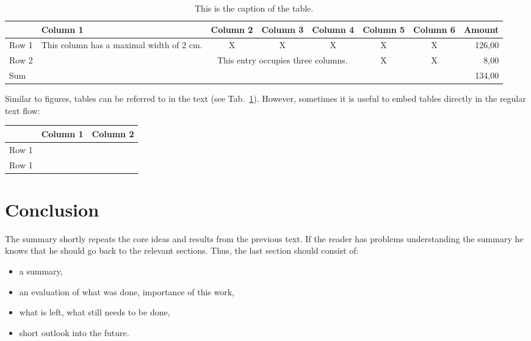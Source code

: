 \documentclass[A4,twocolumn]{article}
\begin{document}
\begin{table}

\begin{center}
\begin{tabular}{|l|p{2cm}|c|c|c|c|c|r|}
\hline
	& Column 1 & Column 2 & Column 3 & Column 4& Column 5& Column 6& 
Amount\\
\hline
Row 1 & This column has a maximal width of 2 cm.& X & X& X& X& X& 126,00\\
\hline
Row 2 & & \multicolumn{3}{p{5cm}|}{This entry occupies three columns.}& X &X 
& 8,00\\
\hline
\multicolumn{7}{|l}{Sum} &134,00\\
\hline
\end{tabular}
\end{center}

\caption{This is the caption of the table.}
\label{Tab1}

\end{table}

Similar to figures, tables can be referred to in the text (see 
Tab.~\ref{Tab1}). However, sometimes it is useful to embed tables directly in 
the regular text flow:

\begin{center}
\begin{tabular}{|c|c|c|}
\hline
	& Column 1 & Column 2 \\
\hline
Row 1 & & \\
Row 1 & & \\
\hline
\end{tabular}
\end{center}


\section{Conclusion}
\label{conclusion}

The summary shortly repeats the core ideas and results from the
previous text. If the reader has problems understanding the summary
he knows that he should go back to the relevant sections.
Thus, the last section should consist of:

\begin{itemize}
	\item a summary,
	\item an evaluation of what was done, importance of this work,
	\item what is left, what still needs to be done,
        \item short outlook into the future.
\end{itemize}
\end{document}

